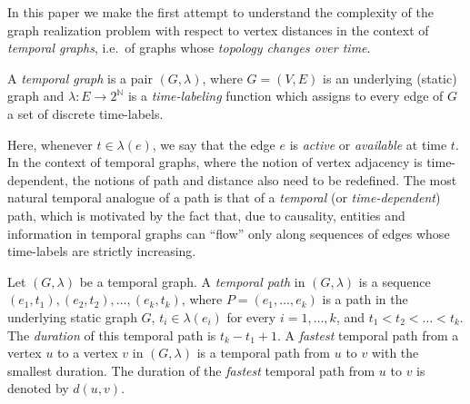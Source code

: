 \documentclass[a4paper,UKenglish,cleveref, autoref, thm-restate]{lipics-v2021}
\begin{document}
In this paper we make the first attempt to understand the complexity of the graph realization problem with respect to vertex distances in the context of \emph{temporal graphs}, i.e.~of graphs whose \emph{topology changes over time}. 

\begin{definition}
\label{temp-graph-def} A \emph{temporal graph} is a pair $(G,\lambda)$,
where $G=(V,E)$ is an underlying (static) graph and $\lambda :E\rightarrow 2^\mathbb{N}$ is a \emph{time-labeling} function which assigns to every edge of $G$ a set of discrete time-labels.
\end{definition}

Here, whenever $t \in \lambda(e)$, we say that the edge $e$ is \emph{active} or \emph{available} at time $t$. In the context of temporal graphs, where the notion of vertex adjacency is time-dependent, the notions of path and distance also need to be redefined. The most natural temporal analogue of a path is that of a \emph{temporal} (or \emph{time-dependent}) path, which is motivated by the fact that, due to
causality, entities and information in temporal graphs can ``flow'' only along sequences of
edges whose time-labels are strictly increasing.

\begin{definition} \label{def:temporalPath+Duration}
Let $(G,\lambda)$ be a temporal graph. A \emph{temporal path} 
in $(G,\lambda)$ is a sequence $(e_1,t_1),(e_2,t_2),\ldots,(e_k,t_k)$, 
where $P=(e_1,\ldots,e_k)$ is a path in the underlying static graph $G$, 
$t_i\in \lambda(e_i)$ for every $i=1,\ldots,k$, and $t_1<t_2<\ldots<t_k$. 
The \emph{duration} of this temporal path %
is $t_k - t_1 + 1$.
A \emph{fastest} temporal path from a vertex $u$ to a vertex $v$ in $(G,\lambda)$ is a temporal path from $u$ to $v$ with the smallest duration.
The duration of the \emph{fastest} temporal path from $u$ to $v$ is denoted by $d(u,v)$.
\end{definition}

\end{document}
